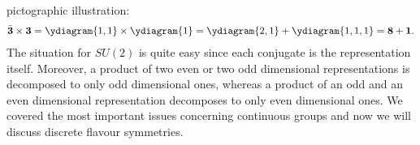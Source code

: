 pictographic illustration:
\begin{align}
 \bar{\textbf{3}} \times \textbf{3} = \ydiagram{1,1}\times\ydiagram{1} =\ydiagram{2,1} + \ydiagram{1,1,1} = \textbf{8} + \textbf{1}.
 \label{eq_singletadjoint}
\end{align}
The situation for $SU(2)$ is quite easy since each conjugate is the representation itself. Moreover, a product of two even or two odd dimensional
representations is decomposed to only odd dimensional ones, whereas a product of an odd and an even dimensional representation decomposes to only
even dimensional ones. We covered the most important issues concerning continuous groups and now we will discuss discrete flavour symmetries.














